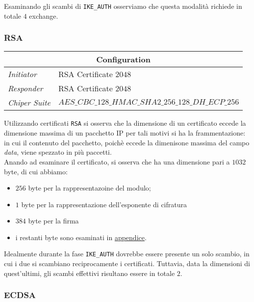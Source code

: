 \documentclass[
10pt, %
a4paper, %
oneside, %
headinclude,footinclude, %
BCOR5mm, %
]{scrartcl}
\begin{document}
\noindent
Esaminando gli scambi di \lstinline|IKE_AUTH| osserviamo che questa modalità richiede in totale $4$ exchange. 

\subsubsection{RSA}

\begin{center}
    \setlength{\arrayrulewidth}{0.4mm}
    \renewcommand{\arraystretch}{1.3}
    \begin{tabular}{|l|l|}
        \hline
        \multicolumn{2}{|c|}{\textbf{Configuration}} \\
        \hline
        \textit{Initiator} & RSA Certificate $2048$ \\
        \textit{Responder} & RSA Certificate $2048$ \\
        \textit{Chiper Suite} & $AES\_CBC\_128\_HMAC\_SHA2\_256\_128\_DH\_ECP\_256$ \\
        \hline
    \end{tabular}
\end{center}
\vspace*{0.2cm}
\noindent
Utilizzando certificati \lstinline|RSA| si osserva che la dimensione di un certificato eccede la dimensione massima di un pacchetto IP
per tali motivi si ha la frammentazione: in cui il contenuto del pacchetto, poichè eccede la dimenisone massima del campo \textit{data}, viene
spezzato in più paccetti.
\newline  \\
\noindent
Anando ad esaminare il certificato, si osserva che ha una dimensione pari a $1032$ byte, di cui abbiamo:
\begin{itemize}
    \item $256$ byte per la rappresentazoine del modulo;
    \item $1$ byte per la rappresentazione dell'esponente di cifratura
    \item $384$ byte per la firma 
    \item i restanti byte sono esaminati in  \hyperlink{certificati}{appendice}.
\end{itemize} 

\noindent
Idealmente durante la fase \lstinline|IKE_AUTH| dovrebbe essere presente un solo scambio, in cui i due si scambiano reciprocamente i certificati. Tuttavia,
data la dimensioni di quest'ultimi, gli scambi effettivi risultano essere in totale $2$. 

\subsubsection{ECDSA}
\end{document}
